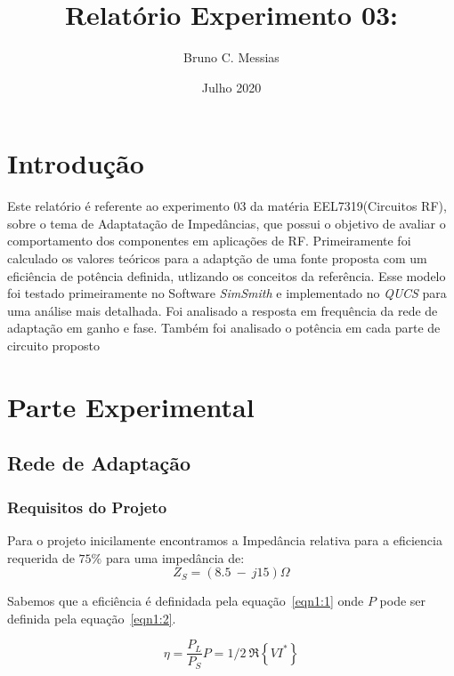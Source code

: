\documentclass[a4paper,12pt]{proc}
\title{Relatório Experimento 03:}
\author{Bruno C. Messias}
\date{Julho 2020}
\begin{document}
\maketitle

\section{Introdução}

Este relatório é referente ao experimento 03 da matéria EEL7319(Circuitos RF), sobre o tema de Adaptatação de Impedâncias, que possui o objetivo de avaliar o comportamento dos componentes em aplicações de RF.
Primeiramente foi  calculado os valores teóricos para a adaptção de uma fonte proposta com um eficiência de potência definida, utlizando os conceitos da referência\cite{Orfanidis2003}.
Esse modelo foi testado primeiramente no Software \textit{SimSmith} e implementado no \textit{QUCS} para uma análise mais detalhada. Foi analisado a resposta em frequência da rede de adaptação em ganho e fase. Também foi analisado o potência em cada parte de circuito proposto  

\section{Parte Experimental}

\subsection{Rede de Adaptação}

\subsubsection{Requisitos do Projeto}

Para o projeto inicilamente encontramos a Impedância relativa para a eficiencia requerida de $75\%$ para uma impedância de: \[Z_{S} = (8.5~-~j15)\Omega\]

\noindent Sabemos que a eficiência é definidada pela equação~\ref{eqn1:1} onde $P$ pode ser definida pela equação~\ref{eqn1:2}.

\begin{subequations}
    \label{eqn1}
    \begin{equation}
        \label{eqn1:1}
        \eta = \frac{P_{L}}{P_{S}}
    \end{equation}

    \begin{equation}
        \label{eqn1:2}
        P = 1/2~\Re \left \{ VI^{\ast } \right \}
    \end{equation}

\end{subequations}
\end{document}
